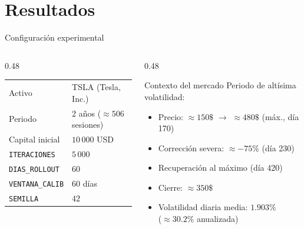 \documentclass[aspectratio=169, 10pt]{beamer}
\begin{document}
\section{Resultados}

\begin{frame}{Configuración experimental}
  \begin{columns}[T]
    \begin{column}{0.48\textwidth}
      \begin{center}
      \small
      \begin{tabular}{ll}
        \toprule
        Activo & TSLA (Tesla, Inc.) \\
        Periodo & 2 años ($\approx 506$ sesiones) \\
        Capital inicial & $10\,000$ USD \\
        \texttt{ITERACIONES} & $5\,000$ \\
        \texttt{DIAS\_ROLLOUT} & $60$ \\
        \texttt{VENTANA\_CALIB} & $60$ días \\
        \texttt{SEMILLA} & $42$ \\
        \bottomrule
      \end{tabular}
      \end{center}
    \end{column}
    \begin{column}{0.48\textwidth}
      \begin{alertblock}{Contexto del mercado}
        Periodo de altísima volatilidad:\\
        \begin{itemize}
          \item Precio: $\approx 150\$$ $\to$ $\approx 480\$$ (máx., día 170)
          \item Corrección severa: $\approx -75\%$ (día 230)
          \item Recuperación al máximo (día 420)
          \item Cierre: $\approx 350\$$
          \item Volatilidad diaria media: $1.903\%$\\
            ($\approx 30.2\%$ anualizada)
        \end{itemize}
      \end{alertblock}
    \end{column}
  \end{columns}
\end{frame}
\end{document}
